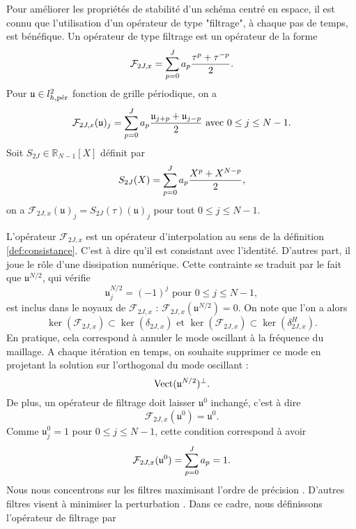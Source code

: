 Pour améliorer les propriétés de stabilité d'un schéma centré en espace, il est connu que l'utilisation d'un opérateur de type "filtrage", à chaque pas de temps, est bénéfique. Un opérateur de type filtrage est un opérateur de la forme
\begin{equation}
\mathcal{F}_{2J,x} = \gsum_{p=0}^J a_p \dfrac{\tau^p + \tau^{-p}}{2}.
\label{eq:ftr}
\end{equation}
Pour $\mathfrak{u} \in l^2_{h,\per}$ fonction de grille périodique, on a
\begin{equation}
\mathcal{F}_{2J,x} (\mathfrak{u} )_j = \gsum_{p=0}^J a_p \dfrac{\mathfrak{u}_{j+p} + \mathfrak{u}_{j-p}}{2} \text{ avec } 0  \leq j \leq N-1.
\end{equation}
Soit $S_{2J} \in \mathbb{R}_{N-1}[X]$ définit par 
\begin{equation}
S_{2J}(X) = \gsum_{p=0}^J a_p \dfrac{X^p + X^{N-p}}{2},
\label{eq:pol_filtrage}
\end{equation}
on a $\mathcal{F}_{2J,x}(\mathfrak{u})_j = S_{2J}(\tau)(\mathfrak{u})_j$ pour tout $0 \leq j \leq N-1$.

L'opérateur $\mathcal{F}_{2J,x}$ est un opérateur d'interpolation au sens de la définition \ref{def:consistance}. C'est à dire qu'il est consistant avec l'identité.
D'autres part, il joue le rôle d'une dissipation numérique. Cette contrainte se traduit par le fait que $\mathfrak{u}^{N/2}$, qui vérifie
\begin{equation}
\mathfrak{u}^{N/2}_j = (-1)^j \text{ pour } 0 \leq j \leq N-1,
\end{equation}
est inclus dans le noyaux de $\mathcal{F}_{2J,x}$ : $\mathcal{F}_{2J,x}(\mathfrak{u}^{N/2}) = \mathfrak{0}$. On note que l'on a alors
\begin{equation}
\ker (\mathcal{F}_{2J,x} ) \subset \ker (\delta_{2J,x} ) \text{ et } \ker (\mathcal{F}_{2J,x} ) \subset \ker (\delta_{2J,x}^H ).
\end{equation}
En pratique, cela correspond à annuler le mode oscillant à la fréquence du maillage. A chaque itération en temps, on souhaite supprimer ce mode en projetant la solution sur l'orthogonal du mode oscillant :
\begin{equation}
\Vect (\mathfrak{u}^{N/2})^{\perp}.
\end{equation}
De plus, un opérateur de filtrage doit laisser $\mathfrak{u}^0$ inchangé, c'est à dire
\begin{equation}
\mathcal{F}_{2J,x}(\mathfrak{u}^{0}) = \mathfrak{u}^{0}.
\end{equation}
Comme $\mathfrak{u}^0_j = 1$ pour $0 \leq j \leq N-1$, cette condition correspond à avoir
\begin{equation}
\mathcal{F}_{2J,x}(\mathfrak{u}^{0}) = \gsum_{p=0}^J a_p = 1.
\end{equation}
Nous nous concentrons sur les filtres maximisant l'ordre de précision \cite{Redonnet2001}. D'autres filtres visent à minimiser la perturbation \cite{Bogey2004}. Dans ce cadre, nous définissons l'opérateur de filtrage par 


